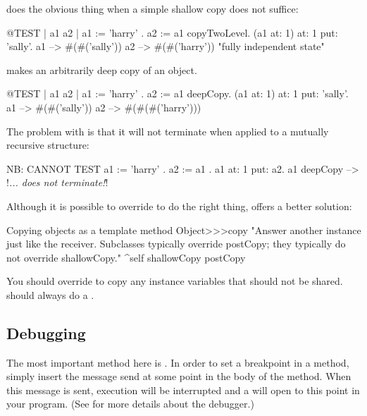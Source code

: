 \documentclass[a4paper,10pt,twoside]{book}
\begin{document}
 does the obvious thing when a simple shallow copy does not suffice:

\begin{code}{@TEST | a1 a2 |}
a1 := { { 'harry' } } .
a2 := a1 copyTwoLevel.
(a1 at: 1) at: 1 put: 'sally'.
a1 --> #(#('sally'))
a2 --> #(#('harry'))    "fully independent state"
\end{code}

 makes an arbitrarily deep copy of an object.

\begin{code}{@TEST | a1 a2 |}
a1 := { { { 'harry' } } } .
a2 := a1 deepCopy.
(a1 at: 1) at: 1 put: 'sally'.
a1 --> #(#('sally'))
a2 --> #(#(#('harry')))
\end{code}

The problem with  is that it will not terminate when applied to a mutually recursive structure:

\begin{code}{NB: CANNOT TEST}
a1 := { 'harry' }.
a2 := { a1 }.
a1 at: 1 put: a2.
a1 deepCopy --> !\emph{... does not terminate!}!
\end{code}

Although it is possible to override  to do the right thing,  offers a better solution:

\begin{method}{Copying objects as a template method}
Object>>>copy
    "Answer another instance just like the receiver.
    Subclasses typically override postCopy;
    they typically do not override shallowCopy."
    ^self shallowCopy postCopy
\end{method}

You should override  to copy any instance variables that should not be shared.  should always do a .


\subsection{Debugging}

The most important method here is . In order to set a breakpoint in a method, simply insert the message send  at some point in the body of the method.  When this message is sent, execution will be interrupted and a  will open to this point in your program.
(See  for more details about the debugger.)
\end{document}
